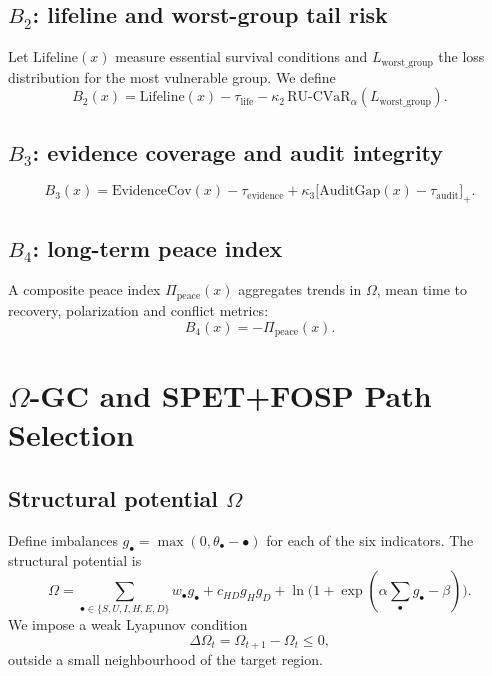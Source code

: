 \documentclass[11pt]{article}
\begin{document}
\subsection{$B_2$: lifeline and worst-group tail risk}

Let $\mathrm{Lifeline}(x)$ measure essential survival conditions and $L_{\mathrm{worst\_group}}$ the loss distribution for the most vulnerable group. We define
\begin{equation}
B_2(x) 
= \mathrm{Lifeline}(x) - \tau_{\mathrm{life}}
- \kappa_2\,\mathrm{RU\text{-}CVaR}_\alpha(L_{\mathrm{worst\_group}}).
\end{equation}

\subsection{$B_3$: evidence coverage and audit integrity}

\begin{equation}
B_3(x)
= \mathrm{EvidenceCov}(x) - \tau_{\mathrm{evidence}}
+ \kappa_3\big[\mathrm{AuditGap}(x) - \tau_{\mathrm{audit}}\big]_+.
\end{equation}

\subsection{$B_4$: long-term peace index}

A composite peace index $\Pi_{\mathrm{peace}}(x)$ aggregates trends in $\Omega$, mean time to recovery, polarization and conflict metrics:
\begin{equation}
B_4(x) = -\Pi_{\mathrm{peace}}(x).
\end{equation}

\section{$\Omega$-GC and SPET+FOSP Path Selection}
\label{sec:omega}

\subsection{Structural potential $\Omega$}

Define imbalances $g_\bullet = \max(0,\theta_\bullet-\bullet)$ for each of the six indicators. The structural potential is
\begin{equation}
\Omega = \sum_{\bullet\in\{S,U,I,H,E,D\}} w_\bullet g_\bullet
+ c_{HD} g_H g_D
+ \ln\big(1 + \exp(\alpha \sum_\bullet g_\bullet - \beta)\big).
\end{equation}
We impose a weak Lyapunov condition
\begin{equation}
\Delta\Omega_t = \Omega_{t+1}-\Omega_t \le 0,
\end{equation}
outside a small neighbourhood of the target region.
\end{document}

